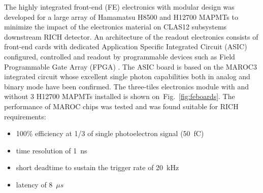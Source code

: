 
The highly integrated front-end (FE) electronics with modular design was developed for a large array of Hamamatsu H8500 and H12700 MAPMTs to minimize the impact of the electronics material on CLAS12 subsystems downstream RICH detector.
An architecture of the readout electronics consists of front-end cards with dedicated Application Specific Integrated Circuit (ASIC) configured, controlled and readout by programmable devices such as Field Programmable Gate Array (FPGA) \cite{RICH_FE}.
The ASIC board is based on the MAROC3  integrated circuit \cite{MAROC} whose excellent single photon capabilities both in analog and binary mode have been confirmed.
The three-tiles electronics module with and without 3 H12700 MAPMTs installed is shown on~Fig.~\ref{fig:feboards}.
The performance of MAROC chips was tested and was found suitable for RICH requirements:
\begin{itemize}
	\item 100\% efficiency at 1/3 of single photoelectron signal (50~fC)
	\item time resolution of 1~ns
	\item short deadtime to sustain the trigger rate of 20~kHz
	\item latency of 8~$\mu s$
\end{itemize}

